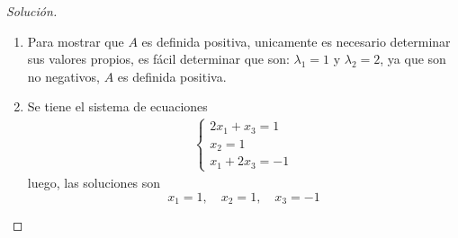 \documentclass[12pt]{book}
\newenvironment{solucion}
  {\renewcommand\qedsymbol{$\square$}\begin{proof}[Solución]}
  {\end{proof}}
\begin{document}
\begin{solucion}
\begin{enumerate}
    \item Para mostrar que $A$ es definida positiva, unicamente es necesario determinar sus valores propios, es fácil determinar que son: $\lambda_1=1$ y $\lambda_2=2$, ya que son no negativos, $A$ es definida positiva.
    \item Se tiene el sistema de ecuaciones
    \begin{align*}
        \begin{cases}
             2x_1+x_3=1\\
             x_2=1\\
             x_1+2x_3=-1
        \end{cases}
    \end{align*}
    luego, las soluciones son
    \[x_1=1,\quad x_2=1,\quad x_3=-1\]
    
\end{enumerate}
\end{solucion}
\end{document}
